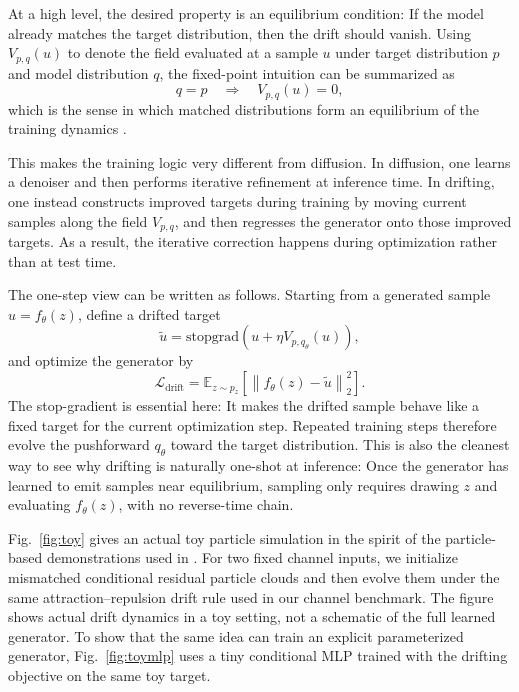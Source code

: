 \documentclass[conference]{IEEEtran}
\begin{document}
At a high level, the desired property is an equilibrium condition:
If the model already matches the target distribution, then the drift should vanish.
Using \(V_{p,q}(u)\) to denote the field evaluated at a sample \(u\) under target distribution \(p\) and model distribution \(q\), the fixed-point intuition can be summarized as
\begin{equation}
q = p
\quad \Longrightarrow \quad
V_{p,q}(u) = 0,
\end{equation}
which is the sense in which matched distributions form an equilibrium of the training dynamics \cite{drifting}.

This makes the training logic very different from diffusion.
In diffusion, one learns a denoiser and then performs iterative refinement at inference time.
In drifting, one instead constructs improved targets during training by moving current samples along the field \(V_{p,q}\), and then regresses the generator onto those improved targets.
As a result, the iterative correction happens during optimization rather than at test time.

The one-step view can be written as follows.
Starting from a generated sample \(u = f_\theta(z)\), define a drifted target
\begin{equation}
\tilde{u}
=
\mathrm{stopgrad}\!\left(
u + \eta V_{p,q_\theta}(u)
\right),
\end{equation}
and optimize the generator by
\begin{equation}
\mathcal{L}_{\text{drift}}
=
\mathbb{E}_{z \sim p_z}
\left[
\left\|
f_\theta(z) - \tilde{u}
\right\|_2^2
\right].
\end{equation}
The stop-gradient is essential here: It makes the drifted sample behave like a fixed target for the current optimization step.
Repeated training steps therefore evolve the pushforward \(q_\theta\) toward the target distribution.
This is also the cleanest way to see why drifting is naturally one-shot at inference:
Once the generator has learned to emit samples near equilibrium, sampling only requires drawing \(z\) and evaluating \(f_\theta(z)\), with no reverse-time chain.

Fig.~\ref{fig:toy} gives an actual toy particle simulation in the spirit of the particle-based demonstrations used in \cite{drifting}.
For two fixed channel inputs, we initialize mismatched conditional residual particle clouds and then evolve them under the same attraction--repulsion drift rule used in our channel benchmark.
The figure shows actual drift dynamics in a toy setting, not a schematic of the full learned generator.
To show that the same idea can train an explicit parameterized generator, Fig.~\ref{fig:toymlp} uses a tiny conditional MLP trained with the drifting objective on the same toy target.
\end{document}
